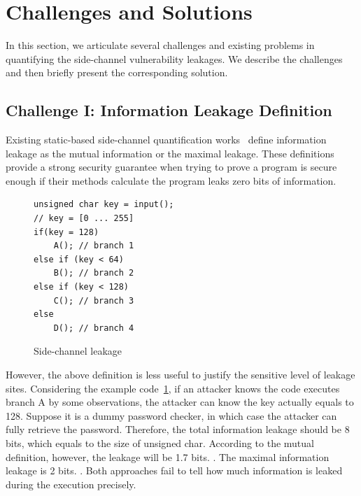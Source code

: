 \section{Challenges and Solutions}

In this section, we articulate several challenges and existing problems
in quantifying the side-channel vulnerability leakages. We describe the
challenges and then briefly present the corresponding solution.

\subsection{Challenge I: Information Leakage Definition}

Existing static-based side-channel quantification works~\cite{182946} define information leakage
as the mutual information or the maximal leakage. These definitions provide a strong security guarantee
when trying to prove a program is secure enough if their methods calculate the program 
leaks zero bits of information.


\begin{figure}[h!]
\centering
\begin{lstlisting}[xleftmargin=.03\textwidth,xrightmargin=.01\textwidth]
unsigned char key = input();
// key = [0 ... 255]
if(key = 128)
    A(); // branch 1
else if (key < 64)
    B(); // branch 2
else if (key < 128)
    C(); // branch 3
else
    D(); // branch 4
\end{lstlisting}
\caption{Side-channel leakage}
\label{code::entropy}
\end{figure}

However, the above definition is less useful to justify the sensitive level of leakage sites. 
Considering the example code~\ref{code::entropy}, if an attacker knows the
code executes branch A by some observations, the attacker can know the key actually equals to 128. 
Suppose it is a dummy password checker, in which case the attacker can fully retrieve the password.
Therefore, the total information leakage should be 8 bits, which equals to the size
of unsigned char. 
According to the mutual definition, however, the leakage will be 1.7 bits. . The maximal information
leakage is 2 bits. . Both approaches fail to tell how 
much information is leaked during the execution precisely.

